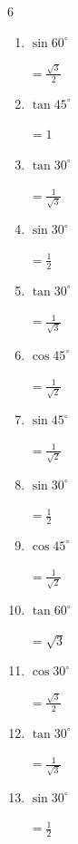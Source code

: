 \begin{multicols}{6}
\begin{enumerate}
  \item $\displaystyle \sin{60^\circ}$

        $\displaystyle =\frac{\sqrt{3}}{2}$

\columnbreak %

  \item $\displaystyle \tan{45^\circ}$

        $\displaystyle =1$

  \item $\displaystyle \tan{30^\circ}$

        $\displaystyle =\frac{1}{\sqrt{3}}$

  \item $\displaystyle \sin{30^\circ}$

        $\displaystyle =\frac{1}{2}$

  \item $\displaystyle \tan{30^\circ}$

        $\displaystyle =\frac{1}{\sqrt{3}}$

  \item $\displaystyle \cos{45^\circ}$

        $\displaystyle =\frac{1}{\sqrt{2}}$

  \item $\displaystyle \sin{45^\circ}$

        $\displaystyle =\frac{1}{\sqrt{2}}$

  \item $\displaystyle \sin{30^\circ}$

        $\displaystyle =\frac{1}{2}$

  \item $\displaystyle \cos{45^\circ}$

        $\displaystyle =\frac{1}{\sqrt{2}}$

  \item $\displaystyle \tan{60^\circ}$

        $\displaystyle =\sqrt{3}$

  \item $\displaystyle \cos{30^\circ}$

        $\displaystyle =\frac{\sqrt{3}}{2}$

  \item $\displaystyle \tan{30^\circ}$

        $\displaystyle =\frac{1}{\sqrt{3}}$

  \item $\displaystyle \sin{30^\circ}$

        $\displaystyle =\frac{1}{2}$


\end{enumerate}
\end{multicols}
